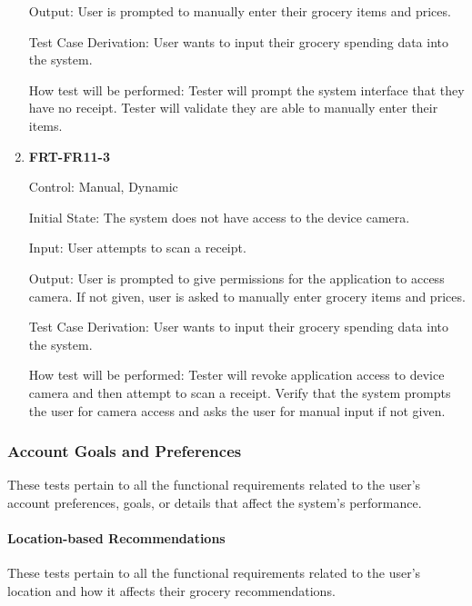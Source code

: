 \documentclass[12pt, titlepage]{article}
\begin{document}
\begin{enumerate}
Output: User is prompted to manually enter their grocery items and prices.

Test Case Derivation: User wants to input their grocery spending data into the system.
          
How test will be performed: Tester will prompt the system interface that they have no receipt. Tester will validate they are able to manually enter their items.

\item{\textbf{FRT-FR11-3}}

Control: Manual, Dynamic
          
Initial State: The system does not have access to the device camera.

Input: User attempts to scan a receipt.
          
Output: User is prompted to give permissions for the application to access camera. If not given, user is asked to manually enter grocery items and prices.

Test Case Derivation: User wants to input their grocery spending data into the system.
          
How test will be performed: Tester will revoke application access to device camera and then attempt to scan a receipt. Verify that the system prompts the user for camera access and asks the user for manual input if not given.

\end{enumerate}

\subsubsection{Account Goals and Preferences}

These tests pertain to all the functional requirements related to the user's account preferences, goals, or details that affect the system's performance.

\paragraph{Location-based Recommendations}

These tests pertain to all the functional requirements related to the user's location and how it affects their grocery recommendations.
\end{document}
